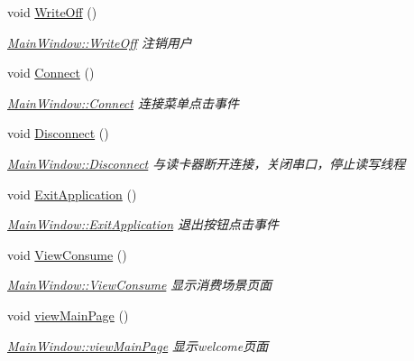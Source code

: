 \begin{DoxyCompactItemize}
void \mbox{\hyperlink{class_main_window_aae6b6877a9efd611b15d4e7601c3b45a}{Write\+Off}} ()
\begin{DoxyCompactList}\small\item\em \mbox{\hyperlink{class_main_window_aae6b6877a9efd611b15d4e7601c3b45a}{Main\+Window\+::\+Write\+Off}} 注销用户 \end{DoxyCompactList}\item 
void \mbox{\hyperlink{class_main_window_a24ffccc8ae4041a33faa25844a3db1f8}{Connect}} ()
\begin{DoxyCompactList}\small\item\em \mbox{\hyperlink{class_main_window_a24ffccc8ae4041a33faa25844a3db1f8}{Main\+Window\+::\+Connect}} 连接菜单点击事件 \end{DoxyCompactList}\item 
void \mbox{\hyperlink{class_main_window_a4c998ea4be4f3f4ead67e5af459b89de}{Disconnect}} ()
\begin{DoxyCompactList}\small\item\em \mbox{\hyperlink{class_main_window_a4c998ea4be4f3f4ead67e5af459b89de}{Main\+Window\+::\+Disconnect}} 与读卡器断开连接，关闭串口，停止读写线程 \end{DoxyCompactList}\item 
void \mbox{\hyperlink{class_main_window_a45f9088074a2cb76009c6a7f047fbace}{Exit\+Application}} ()
\begin{DoxyCompactList}\small\item\em \mbox{\hyperlink{class_main_window_a45f9088074a2cb76009c6a7f047fbace}{Main\+Window\+::\+Exit\+Application}} 退出按钮点击事件 \end{DoxyCompactList}\item 
void \mbox{\hyperlink{class_main_window_a0d17e2ebc098f3d11f2074378c8aaebc}{View\+Consume}} ()
\begin{DoxyCompactList}\small\item\em \mbox{\hyperlink{class_main_window_a0d17e2ebc098f3d11f2074378c8aaebc}{Main\+Window\+::\+View\+Consume}} 显示消费场景页面 \end{DoxyCompactList}\item 
void \mbox{\hyperlink{class_main_window_a436dc8be6b93d1c347e5422fb3550a0b}{view\+Main\+Page}} ()
\begin{DoxyCompactList}\small\item\em \mbox{\hyperlink{class_main_window_a436dc8be6b93d1c347e5422fb3550a0b}{Main\+Window\+::view\+Main\+Page}} 显示welcome页面 \end{DoxyCompactList}\item 

\end{DoxyCompactItemize}
